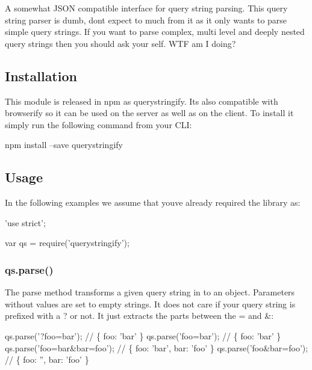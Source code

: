 \href{http://unshift.io}{\tt }\href{http://browsenpm.org/package/querystringify}{\tt }\href{https://travis-ci.org/unshiftio/querystringify}{\tt }\href{https://david-dm.org/unshiftio/querystringify}{\tt }\href{https://coveralls.io/r/unshiftio/querystringify?branch=master}{\tt }\href{http://webchat.freenode.net/?channels=unshift}{\tt }

A somewhat J\+S\+ON compatible interface for query string parsing. This query string parser is dumb, don\textquotesingle{}t expect to much from it as it only wants to parse simple query strings. If you want to parse complex, multi level and deeply nested query strings then you should ask your self. W\+TF am I doing?

\subsection*{Installation}

This module is released in npm as {\ttfamily querystringify}. It\textquotesingle{}s also compatible with {\ttfamily browserify} so it can be used on the server as well as on the client. To install it simply run the following command from your C\+LI\+:


\begin{DoxyCode}
npm install --save querystringify
\end{DoxyCode}


\subsection*{Usage}

In the following examples we assume that you\textquotesingle{}ve already required the library as\+:


\begin{DoxyCode}
'use strict';

var qs = require('querystringify');
\end{DoxyCode}


\subsubsection*{qs.\+parse()}

The parse method transforms a given query string in to an object. Parameters without values are set to empty strings. It does not care if your query string is prefixed with a {\ttfamily ?} or not. It just extracts the parts between the {\ttfamily =} and {\ttfamily \&}\+:


\begin{DoxyCode}
qs.parse('?foo=bar');         // \{ foo: 'bar' \}
qs.parse('foo=bar');          // \{ foo: 'bar' \}
qs.parse('foo=bar&bar=foo');  // \{ foo: 'bar', bar: 'foo' \}
qs.parse('foo&bar=foo');      // \{ foo: '', bar: 'foo' \}
\end{DoxyCode}


